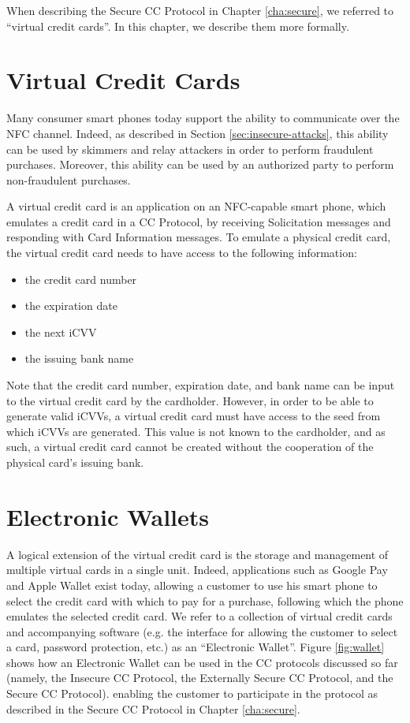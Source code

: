 When describing the Secure CC Protocol in Chapter \ref{cha:secure}, we referred to ``virtual credit cards''.
In this chapter, we describe them more formally.

\section{Virtual Credit Cards}

Many consumer smart phones today support the ability to communicate over the NFC channel.
Indeed, as described in Section \ref{sec:insecure-attacks}, this ability can be used by skimmers and relay attackers in order to perform fraudulent purchases.
Moreover, this ability can be used by an authorized party to perform non-fraudulent purchases.

A virtual credit card is an application on an NFC-capable smart phone, which emulates a credit card in a CC Protocol,
    by receiving Solicitation messages and responding with Card Information messages.
To emulate a physical credit card, the virtual credit card needs to have access to the following information:

\begin{itemize}
\item the credit card number
\item the expiration date
\item the next iCVV
\item the issuing bank name
\end{itemize}

Note that the credit card number, expiration date, and bank name can be input to the virtual credit card by the cardholder.
However, in order to be able to generate valid iCVVs, a virtual credit card must have access to the seed from which iCVVs are generated.
This value is not known to the cardholder, and as such, a virtual credit card cannot be created without the cooperation of the physical card's issuing bank.


\section{Electronic Wallets}
A logical extension of the virtual credit card is the storage and management of multiple virtual cards in a single unit.
Indeed, applications such as Google Pay and Apple Wallet exist today,
    allowing a customer to use his smart phone to select the credit card with which to pay for a purchase,
    following which the phone emulates the selected credit card.
We refer to a collection of virtual credit cards and accompanying software
    (e.g. the interface for allowing the customer to select a card, password protection, etc.) as an ``Electronic Wallet''.
Figure \ref{fig:wallet} shows how an Electronic Wallet can be used in the CC protocols discussed so far
    (namely, the Insecure CC Protocol, the Externally Secure CC Protocol, and the Secure CC Protocol).
    enabling the customer to participate in the protocol as described in the Secure CC Protocol in Chapter \ref{cha:secure}.

